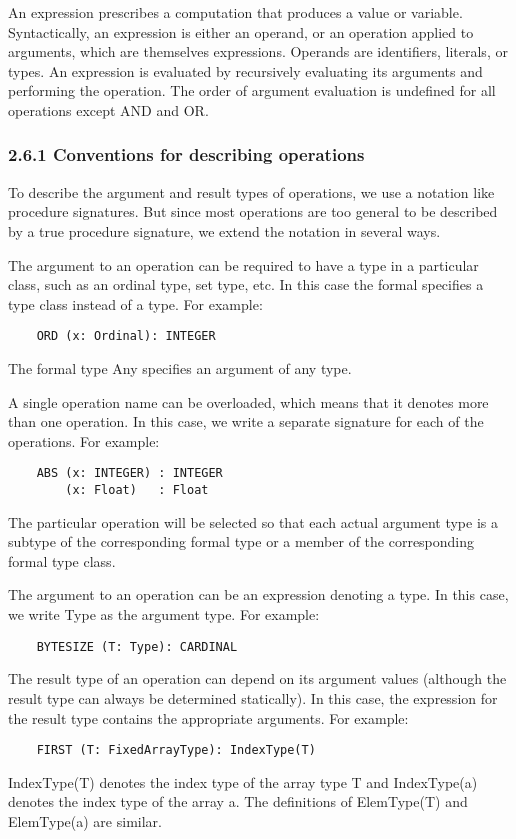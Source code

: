 \documentclass[10pt]{article}
\begin{document}
An expression prescribes a computation that produces a value or
variable.  Syntactically, an expression is either an operand, or an operation
applied to arguments, which are themselves expressions.  Operands are
identifiers, literals, or types.  An expression is evaluated by recursively
evaluating its arguments and performing the operation.  The order of argument
evaluation is undefined for all operations except AND and OR.

\subsubsection*{2.6.1 Conventions for describing operations}

To describe the argument and result types of operations, we use a notation
like procedure signatures.  But since most operations are too general to be
described by a true procedure signature, we extend the notation in several
ways.

The argument to an operation can be required to have a type in a particular
class, such as an ordinal type, set type, etc.  In this case the formal
specifies a type class instead of a type.  For example:
\begin{verbatim}
    ORD (x: Ordinal): INTEGER
\end{verbatim}
The formal type Any specifies an argument of any type.

A single operation name can be overloaded, which means that it denotes more
than one operation.  In this case, we write a separate signature for each of
the operations.  For example:
\begin{verbatim}
    ABS (x: INTEGER) : INTEGER
        (x: Float)   : Float
\end{verbatim}
The particular operation will be selected so that each actual argument type is
a subtype of the corresponding formal type or a member of the corresponding
formal type class.

The argument to an operation can be an expression denoting a type.  In this
case, we write Type as the argument type.  For example:
\begin{verbatim}
    BYTESIZE (T: Type): CARDINAL
\end{verbatim}
The result type of an operation can depend on its argument values (although
the result type can always be determined statically).  In this case, the
expression for the result type contains the appropriate arguments.  For
example:
\begin{verbatim}
    FIRST (T: FixedArrayType): IndexType(T)
\end{verbatim}
IndexType(T) denotes the index type of the array type T and IndexType(a)
denotes the index type of the array a.  The definitions of ElemType(T) and
ElemType(a) are similar.
\end{document}

